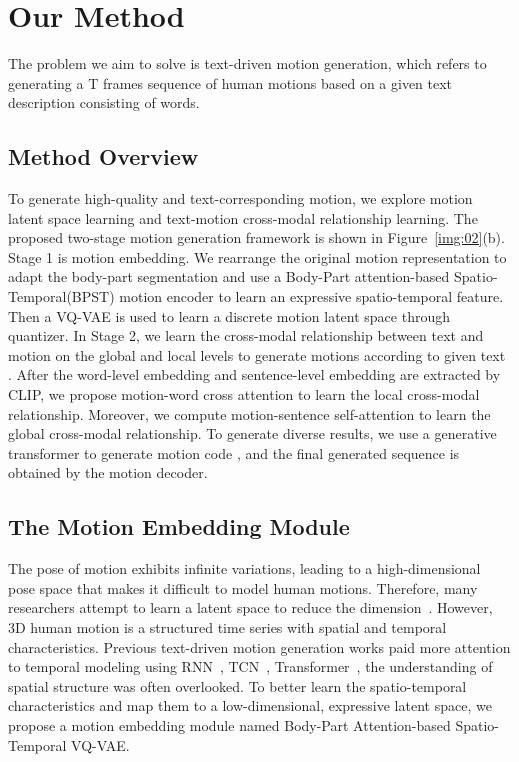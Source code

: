 \documentclass[10pt,twocolumn,letterpaper]{article}
\begin{document}
\section{Our Method}
The problem we aim to solve is text-driven motion generation, which refers to generating a T frames sequence of human motions  based on a given text description  consisting of  words.

\subsection{Method Overview}
To generate high-quality and text-corresponding motion, we explore motion latent space learning and text-motion cross-modal relationship learning. The proposed two-stage motion generation framework is shown in Figure~\ref{img:02}(b).
Stage 1 is motion embedding. We rearrange the original motion representation to adapt the body-part segmentation and use a Body-Part attention-based Spatio-Temporal(BPST) motion encoder to learn an expressive spatio-temporal feature. Then a VQ-VAE is used to learn a discrete motion latent space  through quantizer. In Stage 2, we learn the cross-modal relationship between text and motion on the global and local levels to generate motions according to given text . After the word-level embedding  and sentence-level embedding  are extracted by CLIP, we propose motion-word cross attention to learn the local cross-modal relationship. Moreover, we compute motion-sentence self-attention to learn the global cross-modal relationship. To generate diverse results, we use a generative transformer to generate motion code , and the final generated sequence is obtained by the motion decoder.
 

\subsection{The Motion Embedding Module}
The pose of motion exhibits infinite variations, leading to a high-dimensional pose space that makes it difficult to model human motions. Therefore, many researchers attempt to learn a latent space to reduce the dimension~\cite{guo2022generating,chen2023mld,zhang2023t2m}. However, 3D human motion is a structured time series with spatial and temporal characteristics. Previous text-driven motion generation works paid more attention to temporal modeling using RNN~\cite{guo2020action2motion}, TCN~\cite{guo2022generating,zhang2023t2m}, Transformer~\cite{petrovich2022temos}, the understanding of spatial structure was often overlooked. To better learn the spatio-temporal characteristics and map them to a low-dimensional, expressive latent space, we propose a motion embedding module named Body-Part Attention-based Spatio-Temporal VQ-VAE.
\end{document}
